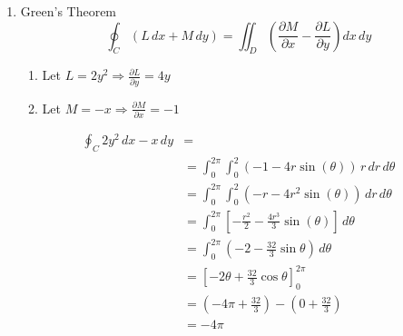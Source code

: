 \documentclass[letter,11pt]{article}
\begin{document}
\begin{enumerate}[label = \roman*.]
    \item Green’s Theorem
    $$\oint_C (L\, dx + M\, dy) = \iint_{D} \left(\frac{\partial M}{\partial x} - \frac{\partial L}{\partial y}\right) dx\, dy$$
    \begin{enumerate}
        \item Let $L=2y^2 \Longrightarrow \frac{\partial L}{\partial y} = 4y$
        \item Let $M=-x \Longrightarrow \frac{\partial M}{\partial x} = -1$
    \end{enumerate}
    \begin{align*}
        \oint_{C} 2y^2\, dx -x \,dy &=\\
        &= \int_{0}^{2\pi}\int_{0}^{2}\left(-1-4r\sin\left(\theta\right)\right)\, r\, dr\, d\theta\\
        &= \int_{0}^{2\pi}\int_{0}^{2}\left(-r-4r^{2}\sin\left(\theta\right)\right)\,dr\,d\theta\\
        &= \int_{0}^{2\pi}\left[-\frac{r^{2}}{2}-\frac{4r^{3}}{3}\sin\left(\theta\right)\right] \, d\theta\\
        &= \int_{0}^{2\pi}\left(-2-\frac{32}{3}\sin\theta\right)\,d\theta\\
        &=\left[-2\theta+\frac{32}{3}\cos\theta\right]_{0}^{2\pi}\\
        &= \left(-4\pi+\frac{32}{3}\right)-\left(0+\frac{32}{3}\right)\\
        &= \boxed{-4\pi}
    \end{align*}
    
\end{enumerate}
\newpage
\end{document}
